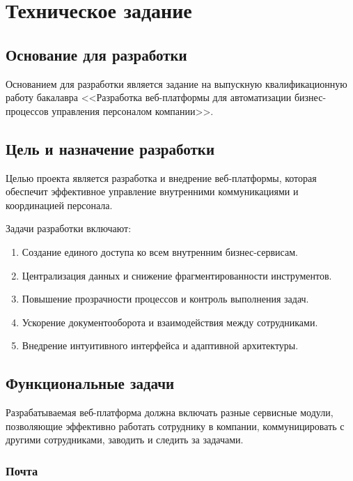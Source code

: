 \section{Техническое задание}

\subsection{Основание для разработки}

Основанием для разработки является задание на выпускную квалификационную работу бакалавра <<Разработка веб-платформы для автоматизации бизнес-процессов управления персоналом компании>>.

\subsection{Цель и назначение разработки}

Целью проекта является разработка и внедрение веб-платформы, которая обеспечит эффективное управление внутренними коммуникациями и координацией персонала.

Задачи разработки включают:

\begin{enumerate}
  \item Создание единого доступа ко всем внутренним бизнес-сервисам.
  \item Централизация данных и снижение фрагментированности инструментов.
  \item Повышение прозрачности процессов и контроль выполнения задач.
  \item Ускорение документооборота и взаимодействия между сотрудниками.
  \item Внедрение интуитивного интерфейса и адаптивной архитектуры.
\end{enumerate}

\subsection{Функциональные задачи}

Разрабатываемая веб-платформа должна включать разные сервисные модули, позволяющие эффективно работать сотруднику в компании, коммуницировать с другими сотрудниками, заводить и следить за задачами.

\subsubsection{Почта}

